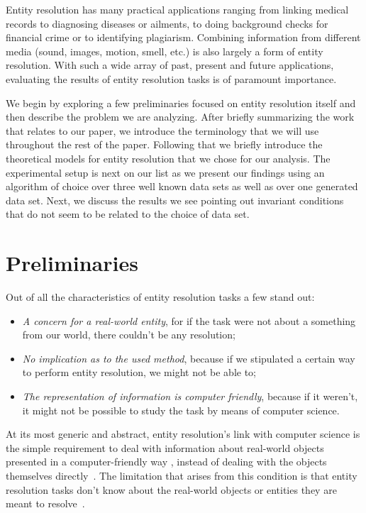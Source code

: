 \documentclass[lettersize,journal]{IEEEtran}
\begin{document}
    Entity resolution has many practical applications ranging from linking
    medical records to diagnosing diseases or ailments, to doing background
    checks for financial crime or to identifying plagiarism.
    Combining information from different media (sound, images, motion, smell,
    etc.) is also largely a form of entity resolution.
    With such a wide array of past, present and future applications, evaluating
    the results of entity resolution tasks is of paramount importance.

    We begin by exploring a few preliminaries focused on entity resolution
    itself and then describe the problem we are analyzing.
    After briefly summarizing the work that relates to our paper, we introduce
    the terminology that we will use throughout the rest of the paper.
    Following that we briefly introduce the theoretical models for entity
    resolution that we chose for our analysis.
    The experimental setup is next on our list as we present our findings using
    an algorithm of choice over three well known data sets as well as over one
    generated data set.
    Next, we discuss the results we see pointing out invariant conditions that
    do not seem to be related to the choice of data set.

    \section{Preliminaries}\label{sec:preliminaries}

    Out of all the characteristics of entity resolution tasks a few stand out:

    \begin{itemize}
        \item\textit{A concern for a real-world entity}, for if the task were
        not about a something from our world, there couldn't be any resolution;
        \item\textit{No implication as to the used method}, because if we
        stipulated a certain way to perform entity resolution, we might not be
        able to;
        \item\textit{The representation of information is computer friendly},
        because if it weren't, it might not be possible to study the task by
        means of computer science.
    \end{itemize}

    At its most generic and abstract, entity resolution's link with computer
    science is the simple requirement to deal with information about real-world
    objects presented in a computer-friendly way , instead of dealing with the
    objects themselves directly~\cite{Tal11}.
    The limitation that arises from this condition is that entity resolution
    tasks don't know about the real-world objects or entities they are meant to
    resolve~\cite{Chen09}.
\end{document}
